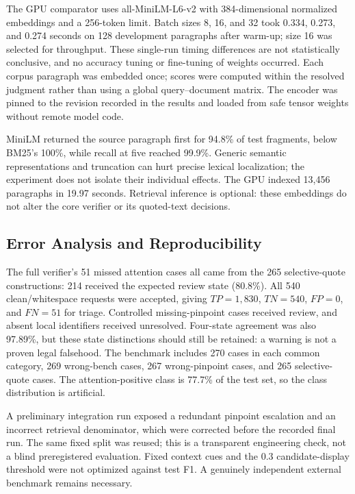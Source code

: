 \documentclass[conference]{IEEEtran}
\begin{document}
The GPU comparator uses all-MiniLM-L6-v2 with 384-dimensional normalized embeddings and a 256-token limit. Batch sizes 8, 16, and 32 took 0.334, 0.273, and 0.274 seconds on 128 development paragraphs after warm-up; size 16 was selected for throughput. These single-run timing differences are not statistically conclusive, and no accuracy tuning or fine-tuning of weights occurred. Each corpus paragraph was embedded once; scores were computed within the resolved judgment rather than using a global query--document matrix. The encoder was pinned to the revision recorded in the results and loaded from safe tensor weights without remote model code.

MiniLM returned the source paragraph first for 94.8\% of test fragments, below BM25's 100\%, while recall at five reached 99.9\%. Generic semantic representations and truncation can hurt precise lexical localization; the experiment does not isolate their individual effects. The GPU indexed 13,456 paragraphs in 19.97 seconds. Retrieval inference is optional: these embeddings do not alter the core verifier or its quoted-text decisions.

\subsection{Error Analysis and Reproducibility}
The full verifier's 51 missed attention cases all came from the 265 selective-quote constructions: 214 received the expected review state (80.8\%). All 540 clean/whitespace requests were accepted, giving $TP=1{,}830$, $TN=540$, $FP=0$, and $FN=51$ for triage. Controlled missing-pinpoint cases received review, and absent local identifiers received unresolved. Four-state agreement was also 97.89\%, but these state distinctions should still be retained: a warning is not a proven legal falsehood. The benchmark includes 270 cases in each common category, 269 wrong-bench cases, 267 wrong-pinpoint cases, and 265 selective-quote cases. The attention-positive class is 77.7\% of the test set, so the class distribution is artificial.

A preliminary integration run exposed a redundant pinpoint escalation and an incorrect retrieval denominator, which were corrected before the recorded final run. The same fixed split was reused; this is a transparent engineering check, not a blind preregistered evaluation. Fixed context cues and the 0.3 candidate-display threshold were not optimized against test F1. A genuinely independent external benchmark remains necessary.
\end{document}
